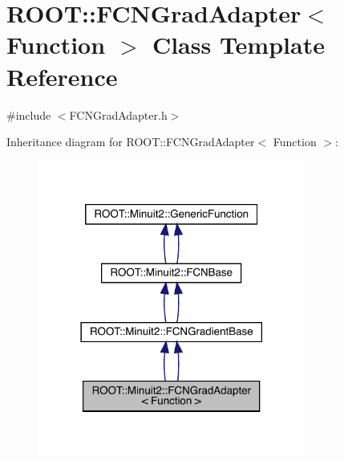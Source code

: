 \hypertarget{classROOT_1_1Minuit2_1_1FCNGradAdapter}{}\section{R\+O\+OT\+:\+:F\+C\+N\+Grad\+Adapter$<$ Function $>$ Class Template Reference}
\label{classROOT_1_1Minuit2_1_1FCNGradAdapter}


{\ttfamily \#include $<$F\+C\+N\+Grad\+Adapter.\+h$>$}



Inheritance diagram for R\+O\+OT\+:\+:F\+C\+N\+Grad\+Adapter$<$ Function $>$\+:\nopagebreak
\begin{figure}[H]
\begin{center}
\leavevmode
\includegraphics[width=249pt]{d5/dde/classROOT_1_1Minuit2_1_1FCNGradAdapter__inherit__graph}
\end{center}
\end{figure}


